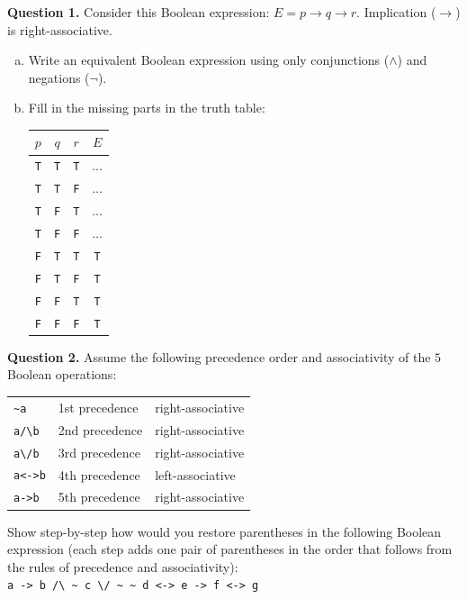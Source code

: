 \documentclass[jou]{apa6}
\begin{document}
{\bf Question 1.} 
Consider this Boolean expression: $E = p \rightarrow q \rightarrow r$. 
Implication ($\rightarrow$) is right-associative. 
\begin{enumerate}[(a)]
\item Write an equivalent Boolean expression using only conjunctions ($\wedge$) and negations ($\neg$). 
\item Fill in the missing parts in the truth table:\\
\begin{tabular}{ c | c | c | c }
$p$ & $q$ & $r$ & $E$ \\ \hline
{\tt T} & {\tt T} & {\tt T} & $\ldots$ \\ \hline
{\tt T} & {\tt T} & {\tt F} & $\ldots$ \\ \hline
{\tt T} & {\tt F} & {\tt T} & $\ldots$ \\ \hline
{\tt T} & {\tt F} & {\tt F} & $\ldots$ \\ \hline
{\tt F} & {\tt T} & {\tt T} & {\tt T} \\ \hline
{\tt F} & {\tt T} & {\tt F} & {\tt T} \\ \hline
{\tt F} & {\tt F} & {\tt T} & {\tt T} \\ \hline
{\tt F} & {\tt F} & {\tt F} & {\tt T} \\ \hline
\end{tabular}
\end{enumerate}

\vspace{6pt}
{\bf Question 2.} 
Assume the following precedence order and associativity of the $5$ Boolean operations: 

\begin{tabular}{lll}
{\tt \textasciitilde{}a} & 1st precedence & right-associative \\
{\tt a/\textbackslash{}b} & 2nd precedence & right-associative \\
{\tt a\textbackslash{}/b} & 3rd precedence & right-associative \\
{\tt a<->b} & 4th precedence & left-associative \\
{\tt a->b} & 5th precedence & right-associative 
\end{tabular}

Show step-by-step how would you restore parentheses in the following 
Boolean expression (each step adds one pair of parentheses \textendash{}
in the order that follows from the rules of precedence 
and associativity):\\
{\tt a -> b /\textbackslash{} \textasciitilde{} c 
\textbackslash{}/ \textasciitilde{} \textasciitilde{} d 
<-> e -> f <-> g}
\end{document}
